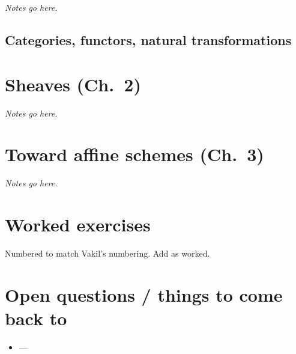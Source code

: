 \documentclass[11pt]{article}
\theoremstyle{definition}
\newtheorem{exercise}[theorem]{Exercise}
\theoremstyle{remark}
\begin{document}
\textit{Notes go here.}

\subsection{Categories, functors, natural transformations}

\section{Sheaves (Ch.~2)}

\textit{Notes go here.}

\section{Toward affine schemes (Ch.~3)}

\textit{Notes go here.}

\section{Worked exercises}

Numbered to match Vakil's numbering. Add as worked.


\section*{Open questions / things to come back to}

\begin{itemize}
  \item ---
\end{itemize}
\end{document}
